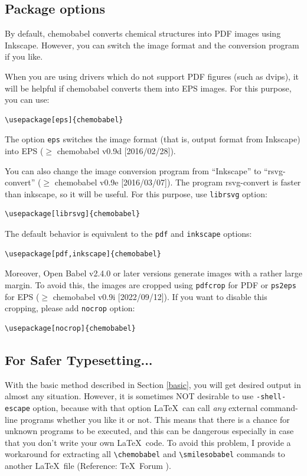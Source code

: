 \documentclass[12pt]{ltjsarticle}
\begin{document}
\clearpage

\subsection{Package options}

By default, \textsf{chemobabel} converts chemical structures into
PDF images using Inkscape. However, you can switch the image format
and the conversion program if you like.

When you are using drivers which do not support PDF figures (such as dvips),
it will be helpful if \textsf{chemobabel} converts them into EPS images.
For this purpose, you can use:
\begin{verbatim}
\usepackage[eps]{chemobabel}
\end{verbatim}
The option \verb|eps| switches the image format (that is, output format
from Inkscape) into EPS ($\ge$ \textsf{chemobabel} v0.9d [2016/02/28]).

You can also change the image conversion program from ``Inkscape'' to
``rsvg-convert'' ($\ge$ \textsf{chemobabel} v0.9e [2016/03/07]).
The program rsvg-convert is faster than inkscape, so it will be useful.
For this purpose, use \verb|librsvg| option:
\begin{verbatim}
\usepackage[librsvg]{chemobabel}
\end{verbatim}
The default behavior is equivalent to the \verb|pdf| and \verb|inkscape| options:
\begin{verbatim}
\usepackage[pdf,inkscape]{chemobabel}
\end{verbatim}

Moreover, Open Babel v2.4.0 or later versions generate images with
a rather large margin. To avoid this, the images are cropped
using \verb|pdfcrop| for PDF or \verb|ps2eps| for EPS
($\ge$ \textsf{chemobabel} v0.9i [2022/09/12]).
If you want to disable this cropping, please add \verb|nocrop| option:
\begin{verbatim}
\usepackage[nocrop]{chemobabel}
\end{verbatim}

\clearpage

\subsection{For Safer Typesetting...}
\label{extract}

With the basic method described in Section \ref{basic},
you will get desired output in almost any situation.
However, it is sometimes NOT desirable to use \verb|-shell-escape| option,
because with that option \LaTeX\ can call \emph{any} external command-line
programs whether you like it or not.
This means that there is a chance for unknown programs to be executed,
and this can be dangerous especially in case that you don't write your
own \LaTeX\ code. To avoid this problem, I provide a workaround for
extracting all \verb|\chemobabel| and \verb|\smilesobabel| commands
to another \LaTeX\ file (Reference: \TeX\ Forum \cite{OKU}).
\end{document}
